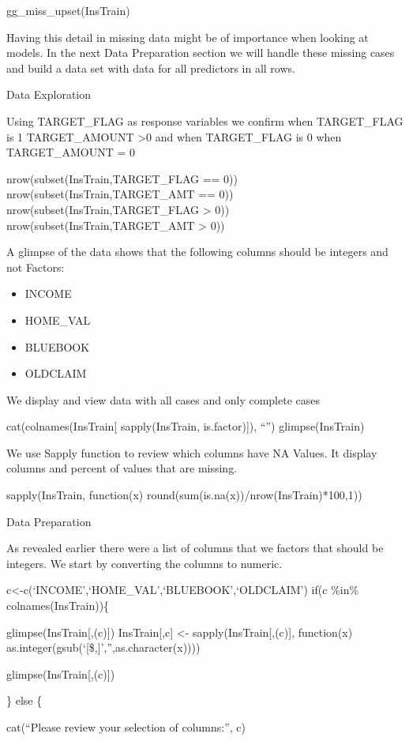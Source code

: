 \documentclass[]{article}
\providecommand{\tightlist}{%
  \setlength{\itemsep}{0pt}\setlength{\parskip}{0pt}}
\begin{document}
gg\_miss\_upset(InsTrain)

Having this detail in missing data might be of importance when looking
at models. In the next Data Preparation section we will handle these
missing cases and build a data set with data for all predictors in all
rows.

Data Exploration

Using TARGET\_FLAG as response variables we confirm when TARGET\_FLAG is
1 TARGET\_AMOUNT \textgreater0 and when TARGET\_FLAG is 0 when
TARGET\_AMOUNT = 0

nrow(subset(InsTrain,TARGET\_FLAG == 0))
nrow(subset(InsTrain,TARGET\_AMT == 0))
nrow(subset(InsTrain,TARGET\_FLAG \textgreater{} 0))
nrow(subset(InsTrain,TARGET\_AMT \textgreater{} 0))

A glimpse of the data shows that the following columns should be
integers and not Factors:

\begin{itemize}
\tightlist
\item
  INCOME
\item
  HOME\_VAL
\item
  BLUEBOOK
\item
  OLDCLAIM
\end{itemize}

We display and view data with all cases and only complete cases

cat(colnames(InsTrain{[} sapply(InsTrain, is.factor){]}), ``\n\n'')
glimpse(InsTrain)

We use Sapply function to review which columns have NA Values. It
display columns and percent of values that are missing.

sapply(InsTrain, function(x) round(sum(is.na(x))/nrow(InsTrain)*100,1))

Data Preparation

As revealed earlier there were a list of columns that we factors that
should be integers. We start by converting the columns to numeric.

c\textless-c(`INCOME',`HOME\_VAL',`BLUEBOOK',`OLDCLAIM') if(c \%in\%
colnames(InsTrain))\{

glimpse(InsTrain{[},(c){]}) InsTrain{[},c{]} \textless-
sapply(InsTrain{[},(c){]}, function(x)
as.integer(gsub(`{[}\$,{]}','',as.character(x))))

glimpse(InsTrain{[},(c){]})

\} else \{

cat(``Please review your selection of columns:'', c)
\end{document}
